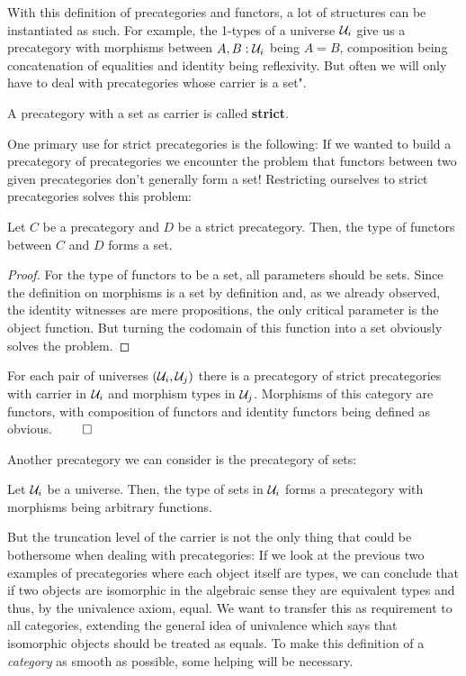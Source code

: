 With this definition of precategories and functors, a lot of structures can be
instantiated as such.
For example, the 1-types of a universe $\mathcal{U}_i$ give us a precategory with morphisms
between $A, B : \mathcal{U}_i$ being $A = B$, composition being concatenation of equalities
and identity being reflexivity.
But often we will only have to deal with precategories whose carrier is a set".

\begin{defn} \label{def:hott-strict-precat}
A precategory with a set as carrier is called \textbf{strict}.
\end{defn}

One primary use for strict precategories is the following:
If we wanted to build a precategory of precategories we encounter the problem that
functors between two given precategories don't generally form a set!
Restricting ourselves to strict precategories solves this problem:

\begin{lemma}
Let $C$ be a precategory and $D$ be a strict precategory.
Then, the type of functors between $C$ and $D$ forms a set.
\end{lemma}

\begin{proof}
For the type of functors to be a set, all parameters should be sets.
Since the definition on morphisms is a set by definition and,
as we already observed, the identity witnesses are mere propositions,
the only critical parameter is the object function.
But turning the codomain of this function into a set obviously solves the
problem.
\end{proof}

\begin{corollary}
For each pair of universes $(\mathcal{U}_i, \mathcal{U}_j)$ there is a precategory of strict
precategories with carrier in $\mathcal{U}_i$ and morphism types in $\mathcal{U}_j$. Morphisms of
this category are functors, with composition of functors and identity functors
being defined as obvious. \hfill $\qed$
\end{corollary}

Another precategory we can consider is the precategory of sets:

\begin{lemma}
Let $\mathcal{U}_i$ be a universe. Then, the type of sets in $\mathcal{U}_i$ forms a precategory
with morphisms being arbitrary functions.
\end{lemma}

But the truncation level of the carrier is not the only thing that could be bothersome
when dealing with precategories:
If we look at the previous two examples of precategories where each object itself
are types, we can conclude that if two objects are isomorphic in the algebraic sense
they are equivalent types and thus, by the univalence axiom, equal.
We want to transfer this as requirement to all categories, extending the general
idea of univalence which says that isomorphic objects should be treated as equals.
To make this definition of a \emph{category} as smooth as possible, some helping
will be necessary.

